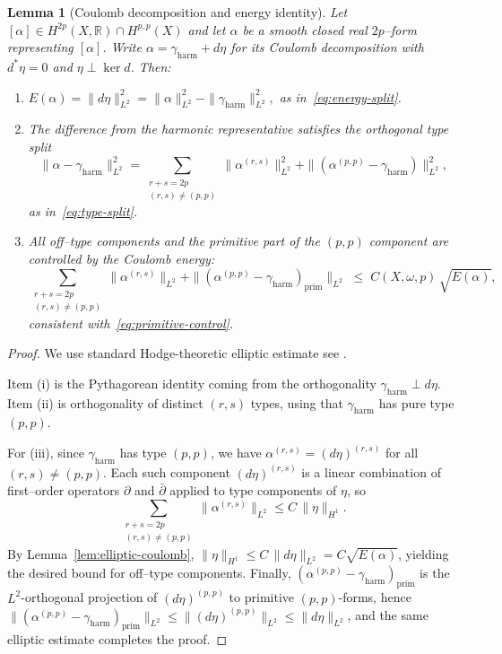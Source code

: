 \documentclass[11pt]{article}
\newcommand{\REV}[1]{\textcolor{blue}{#1}}
\numberwithin{equation}{section}  %
\theoremstyle{plain}
\newtheorem{lemma}[theorem]{Lemma}
\theoremstyle{definition}
\theoremstyle{remark}
\newcommand{\RR}{\mathbb{R}}
\newcommand{\harm}{\mathrm{harm}}
\newcommand{\prim}{\mathrm{prim}}
\begin{document}
\begin{lemma}[Coulomb decomposition and energy identity]\label{lem:coulomb}
Let \([\alpha]\in H^{2p}(X,\RR)\cap H^{p,p}(X)\) and let \(\alpha\) be a smooth closed real \(2p\)--form representing \([\alpha]\).
Write \(\alpha=\gamma_{\harm}+d\eta\) for its Coulomb decomposition with \(d^*\eta=0\) and \(\eta\perp\ker d\).
Then:

\begin{enumerate}
\item
\(\displaystyle
E(\alpha)=\|d\eta\|_{L^{2}}^{2}
=\|\alpha\|_{L^{2}}^{2}-\|\gamma_{\harm}\|_{L^{2}}^{2},
\)
as in~\eqref{eq:energy-split}.

\item
The difference from the harmonic representative satisfies the orthogonal type split
\[
\|\alpha-\gamma_{\harm}\|_{L^{2}}^{2}
=
\sum_{\substack{r+s=2p\\(r,s)\neq(p,p)}}\|\alpha^{(r,s)}\|_{L^{2}}^{2}
+\|(\alpha^{(p,p)}-\gamma_{\harm})\|_{L^{2}}^{2},
\]
as in~\eqref{eq:type-split}.

\item
All off--type components and the primitive part of the \((p,p)\) component are controlled by the Coulomb energy:
\[
\sum_{\substack{r+s=2p\\(r,s)\neq(p,p)}}\|\alpha^{(r,s)}\|_{L^{2}}
+\|(\alpha^{(p,p)}-\gamma_{\harm})_{\prim}\|_{L^{2}}
\;\le\;
C(X,\omega,p)\,\sqrt{E(\alpha)},
\]
consistent with~\eqref{eq:primitive-control}.
\end{enumerate}
\end{lemma}


\begin{proof}
We use standard Hodge-theoretic elliptic estimate
see \REV{\cite{Wells}}.

Item (i) is the Pythagorean identity coming from the orthogonality \(\gamma_{\harm}\perp d\eta\).
Item (ii) is orthogonality of distinct \((r,s)\) types, using that \(\gamma_{\harm}\) has pure type \((p,p)\).

For (iii), since \(\gamma_{\harm}\) has type \((p,p)\), we have \(\alpha^{(r,s)}=(d\eta)^{(r,s)}\) for all \((r,s)\neq(p,p)\).
Each such component \((d\eta)^{(r,s)}\) is a linear combination of first--order operators \(\partial\) and \(\bar\partial\) applied to type components of \(\eta\),
so
\[
\sum_{\substack{r+s=2p\\(r,s)\neq(p,p)}}\|\alpha^{(r,s)}\|_{L^{2}}
\le C\,\|\eta\|_{H^{1}}.
\]
By Lemma~\ref{lem:elliptic-coulomb}, \(\|\eta\|_{H^{1}}\le C\,\|d\eta\|_{L^{2}}=C\sqrt{E(\alpha)}\), yielding the desired bound for off--type components.
Finally, \((\alpha^{(p,p)}-\gamma_{\harm})_{\prim}\) is the \(L^{2}\)-orthogonal projection of \((d\eta)^{(p,p)}\) to primitive \((p,p)\)-forms, hence
\(\|(\alpha^{(p,p)}-\gamma_{\harm})_{\prim}\|_{L^{2}}\le \|(d\eta)^{(p,p)}\|_{L^{2}}\le \|d\eta\|_{L^{2}}\),
and the same elliptic estimate completes the proof.
\end{proof}
\end{document}
